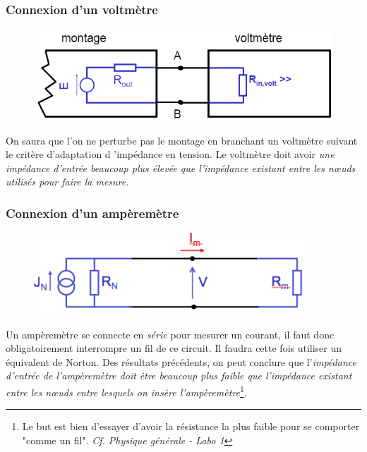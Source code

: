 \documentclass	[11pt, a4paper, openany]{book}
\begin{document}
\subsubsection{Connexion d'un voltmètre}
\begin{figure}
\includegraphics[scale=0.3]{img/image28.png}
\end{figure}
On saura que l'on ne perturbe pas le montage en branchant un voltmètre suivant le critère d'adaptation d 'impédance en tension. Le voltmètre doit avoir \textit{une impédance d'entrée beaucoup plus élevée que l'impédance existant entre les nœuds utilisés pour faire la mesure.}\ \\

\subsubsection{Connexion d'un ampèremètre}
\begin{figure}
\includegraphics[scale=0.3]{img/image29.png}
\end{figure}
Un  ampèremètre se connecte en \textit{série} pour mesurer un courant, il faut donc obligatoirement interrompre un fil de ce circuit. Il faudra cette fois utiliser un équivalent de Norton. Des résultats précédents, on peut conclure que l'\textit{impédance d'entrée de l'ampèremètre doit être beaucoup plus faible que l'impédance existant entre les nœuds entre lesquels on insère l'ampèremètre}\footnote{Le but est bien d'essayer d'avoir la résistance la plus faible pour se comporter "comme un fil". \textit{Cf. Physique générale - Labo 1}}.
\end{document}
